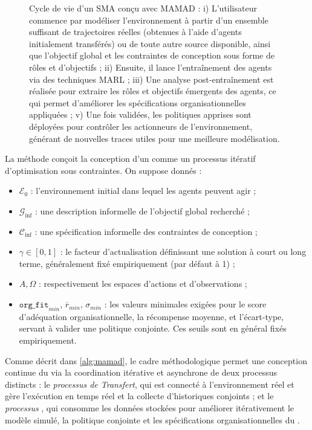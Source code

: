 \begin{figure}[h!]
    \centering
    
    \caption[Cycle de vie d'un SMA conçu avec MAMAD]{Cycle de vie d'un SMA conçu avec MAMAD : i) L'utilisateur commence par modéliser l'environnement à partir d'un ensemble suffisant de trajectoires réelles (obtenues à l'aide d'agents initialement transférés) ou de toute autre source disponible, ainsi que l'objectif global et les contraintes de conception sous forme de rôles et d'objectifs ; \quad ii) Ensuite, il lance l'entraînement des agents via des techniques MARL ; \quad iii) Une analyse post-entraînement est réalisée pour extraire les rôles et objectifs émergents des agents, ce qui permet d'améliorer les spécifications organisationnelles appliquées ; \quad v) Une fois validées, les politiques apprises sont déployées pour contrôler les actionneurs de l'environnement, générant de nouvelles traces utiles pour une meilleure modélisation.}
    \label{fig:cycle}
\end{figure}

La méthode  conçoit la conception d'un  comme un processus itératif d'optimisation sous contraintes. On suppose donnés :
\begin{itemize}
    \item $\mathcal{E}_0$ : l'environnement initial dans lequel les agents peuvent agir ;
    \item $\mathcal{G}_{\text{inf}}$ : une description informelle de l'objectif global recherché ;
    \item $\mathcal{C}_{\text{inf}}$ : une spécification informelle des contraintes de conception ;
    \item $\gamma \in [0,1]$ : le facteur d'actualisation définissant une solution à court ou long terme, généralement fixé empiriquement (par défaut à 1) ;
    \item $A, \Omega$ : respectivement les espaces d'actions et d'observations ;
    \item $\texttt{org\_fit}_{min}$, $\overline{r}_{min}$, $\sigma_{min}$ : les valeurs minimales exigées pour le score d'adéquation organisationnelle, la récompense moyenne, et l'écart-type, servant à valider une politique conjointe. Ces seuils sont en général fixés empiriquement.
\end{itemize}

\noindent Comme décrit dans \autoref{alg:mamad}, le cadre méthodologique permet une conception continue du  via la coordination itérative et asynchrone de deux processus distincts : le \textit{processus de Transfert}, qui est connecté à l'environnement réel et gère l'exécution en temps réel et la collecte d'historiques conjoints ; et le \textit{processus }, qui consomme les données stockées pour améliorer itérativement le modèle simulé, la politique conjointe et les spécifications organisationnelles du .

